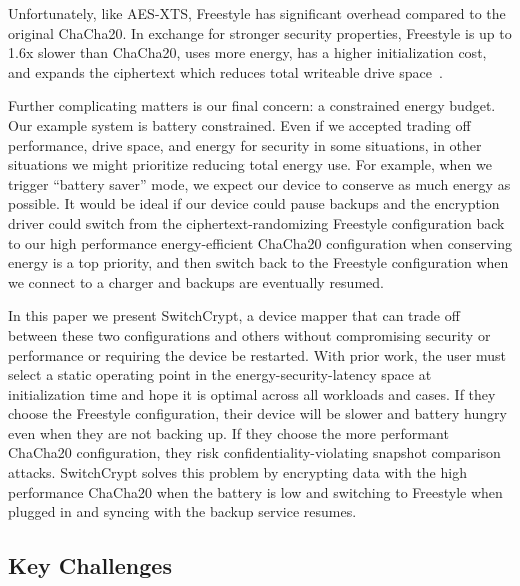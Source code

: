 Unfortunately, like AES-XTS, Freestyle has significant overhead compared to the
original ChaCha20. In exchange for stronger security properties, Freestyle is up
to 1.6x slower than ChaCha20, uses more energy, has a higher initialization
cost, and expands the ciphertext which reduces total writeable drive
space~\cite{Freestyle}.





Further complicating matters is our final concern: a constrained energy budget.
Our example system is battery constrained. Even if we accepted trading off
performance, drive space, and energy for security in some situations, in other
situations we might prioritize reducing total energy use. For example, when we
trigger ``battery saver'' mode, we expect our device to conserve as much energy
as possible. It would be ideal if our device could pause backups and the
encryption driver could switch from the ciphertext-randomizing Freestyle
configuration back to our high performance energy-efficient ChaCha20
configuration when conserving energy is a top priority, and then switch back to
the Freestyle configuration when we connect to a charger and backups are
eventually resumed.

In this paper we present SwitchCrypt, a device mapper that can trade off between
these two configurations and others without compromising security or performance
or requiring the device be restarted. With prior work, the user must select a
static operating point in the energy-security-latency space at initialization
time and hope it is optimal across all workloads and cases. If they choose the
Freestyle configuration, their device will be slower and battery hungry even
when they are not backing up. If they choose the more performant ChaCha20
configuration, they risk confidentiality-violating snapshot comparison attacks.
SwitchCrypt solves this problem by encrypting data with the high performance
ChaCha20 when the battery is low and switching to Freestyle when plugged in and
syncing with the backup service resumes.




\subsection{Key Challenges} %

